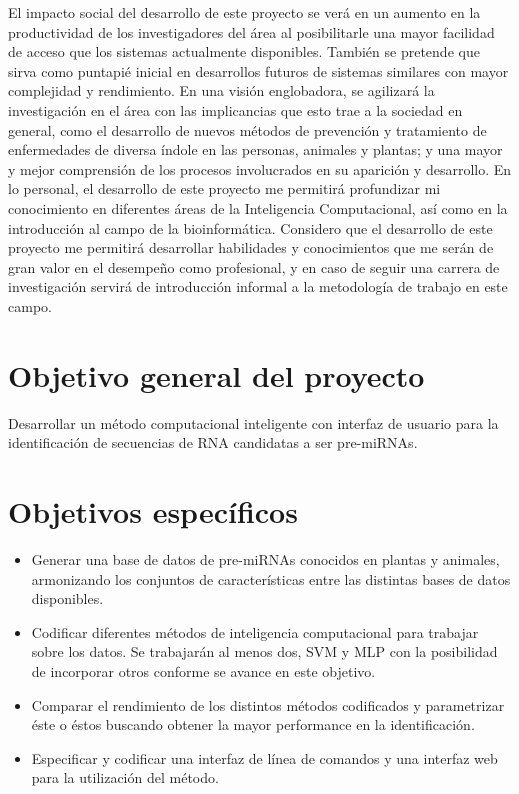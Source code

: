 \documentclass[12pt,bibliography=openstyle,DIV=12,parskip=full-]{scrartcl}
\begin{document}
El impacto social del desarrollo de este proyecto se verá en un
aumento en la productividad de los investigadores del área al
posibilitarle una mayor facilidad de acceso que los sistemas actualmente
disponibles. También se pretende que sirva como puntapié inicial en
desarrollos futuros de sistemas similares con mayor complejidad y
rendimiento. En una visión englobadora, se agilizará la investigación
en el área con las implicancias que esto trae a la sociedad en
general, como el desarrollo de nuevos métodos de prevención y
tratamiento de enfermedades de diversa índole en las personas,
animales y plantas; y una mayor y mejor comprensión de los procesos
involucrados en su aparición y desarrollo.
En lo personal, el desarrollo de este proyecto me permitirá
profundizar mi conocimiento en diferentes áreas de la Inteligencia
Computacional, así como en la introducción al campo de la
bioinformática. Considero que el desarrollo de este proyecto me
permitirá desarrollar habilidades y conocimientos que me serán de gran
valor en el desempeño como profesional, y en caso de seguir una
carrera de investigación servirá de introducción informal a la
metodología de trabajo en este campo.
%
%
\section{Objetivo general del proyecto}
Desarrollar un método computacional inteligente con interfaz de
usuario para la identificación de secuencias de RNA candidatas a ser
pre-miRNAs.
\section{Objetivos específicos}
\begin{itemize}
\item Generar una base de datos de pre-miRNAs conocidos en plantas y
  animales, armonizando los conjuntos de características entre las
  distintas bases de datos disponibles.
\item Codificar diferentes métodos de inteligencia computacional para
  trabajar sobre los datos. Se trabajarán al menos dos, SVM y MLP con
  la posibilidad de incorporar otros conforme se avance en este
  objetivo.
\item Comparar el rendimiento de los distintos métodos codificados y
  parametrizar éste o éstos buscando obtener la mayor performance en
  la identificación.
\item Especificar y codificar una interfaz de línea de comandos y una
  interfaz web para la utilización del método.
\end{itemize}
%
%
\end{document}
